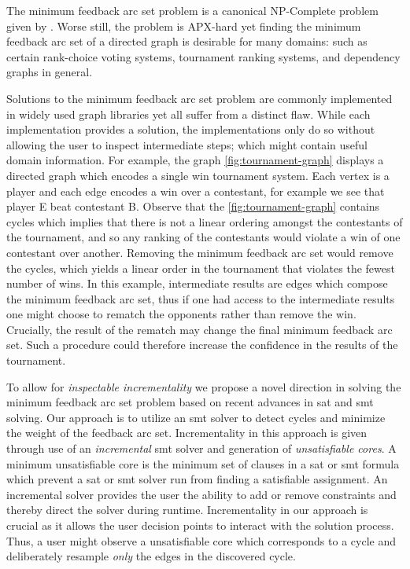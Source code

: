 \label{section:introduction}%

The minimum feedback arc set problem is a canonical NP-Complete problem given
by \citet{KarpNPComplete}. Worse still, the problem is
APX-hard yet finding the minimum feedback arc set
of a directed graph is desirable for many domains: such as certain rank-choice
voting systems, tournament ranking systems, and dependency graphs in
general.

Solutions to the minimum feedback arc set problem are commonly implemented in
widely used graph libraries yet all suffer from a distinct flaw. While each
implementation provides a solution, the implementations only do so without
allowing the user to inspect intermediate steps; which might contain useful
domain information. For example, the graph \autoref{fig:tournament-graph}
displays a directed graph which encodes a single win tournament system. Each
vertex is a player and each edge encodes a win over a contestant, for example we
see that player E beat contestant B. Observe that the
\autoref{fig:tournament-graph} contains cycles which implies that there is not a
linear ordering amongst the contestants of the tournament, and so any ranking of
the contestants would violate a win of one contestant over another. Removing the
minimum feedback arc set would remove the cycles, which yields a linear order in
the tournament that violates the fewest number of wins. In this example,
intermediate results are edges which compose the minimum feedback arc set, thus
if one had access to the intermediate results one might choose to rematch the
opponents rather than remove the win. Crucially, the result of the rematch may
change the final minimum feedback arc set. Such a procedure could therefore
increase the confidence in the results of the tournament.

To allow for \emph{inspectable incrementality} we propose a novel direction in
solving the minimum feedback arc set problem based on recent advances in
\ac{sat} and \ac{smt} solving. Our approach is to utilize an \ac{smt} solver to
detect cycles and minimize the weight of the feedback arc set. Incrementality in
this approach is given through use of an \emph{incremental} \ac{smt} solver and
generation of \emph{unsatisfiable cores}. A minimum unsatisfiable core is the
minimum set of clauses in a \ac{sat} or \ac{smt} formula which prevent a
\ac{sat} or \ac{smt} solver run from finding a satisfiable assignment. An
incremental solver provides the user the ability to add or remove constraints
and thereby direct the solver during runtime. Incrementality in our approach is
crucial as it allows the user decision points to interact with the solution
process. Thus, a user might observe a unsatisfiable core which corresponds to a
cycle and deliberately resample \emph{only} the edges in the discovered cycle.

